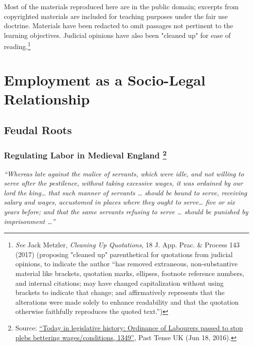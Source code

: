 \documentclass[
  letterpaper,
  11pt,
  DIV=9,
  openright]{scrbook}
\renewenvironment{quote}{
  \list{}{\leftmargin=2em\rightmargin=2em}
  \item\relax\small
}
{\endlist}
\renewcommand*\contentsname{Table of contents}
\newcommand\contentsname{Table of contents}
\begin{document}
Most of the materials reproduced here are in the public domain; excerpts from copyrighted materials are included for teaching purposes under the fair use doctrine. Materials have been redacted to omit passages not pertinent to the learning objectives. Judicial opinions have also been "cleaned up" for ease of reading.\footnote{\textit{See} Jack Metzler, {\textit{Cleaning Up Quotations}}, 18 J. App. Prac. \& Process 143 (2017) (proposing "cleaned up" parenthetical for quotations from judicial opinions, to indicate the author “has removed extraneous, non-substantive material like brackets, quotation marks, ellipses, footnote reference numbers, and internal citations; may have changed capitalization without using brackets to indicate that change; and affirmatively represents that the alterations were made solely to enhance readability and that the quotation otherwise faithfully reproduces the quoted text.”)} 
\renewcommand*\contentsname{Contents}
{
\hypersetup{linkcolor=}
\setcounter{tocdepth}{1}
\tableofcontents
}

\mainmatter
\chapter{Employment as a Socio-Legal
Relationship}\label{employment-as-a-socio-legal-relationship}

\section{Feudal Roots}\label{feudal-roots}

\subsection[Regulating Labor in Medieval England
]{\texorpdfstring{Regulating Labor in Medieval England
\footnote{Source:
  \href{https://pasttense.co.uk/2016/06/18/today-in-legislative-history-ordinance-of-labourers-passed-to-stop-plebs-bettering-wagesconditions-1349/}{``Today
  in legislative history: Ordinance of Labourers passed to stop plebs
  bettering wages/conditions, 1349''}, Past Tense UK (Jun 18, 2016).}}{Regulating Labor in Medieval England }}\label{regulating-labor-in-medieval-england-laborers1349}

\begin{quote}
\emph{``Whereas late against the malice of servants, which were idle,
and not willing to serve after the pestilence, without taking excessive
wages, it was ordained by our lord the king\ldots{} that such manner of
servants \ldots{} should be bound to serve, receiving salary and wages,
accustomed in places where they ought to serve\ldots{} five or six years
before; and that the same servants refusing to serve \ldots{} should be
punished by imprisonment \ldots{}''}
\end{quote}
\end{document}
